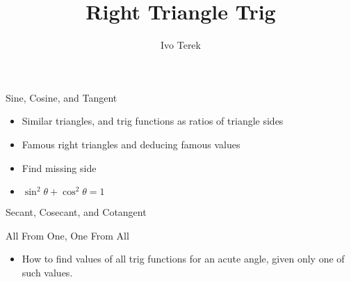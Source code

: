 \documentclass{ximera}
\author{Ivo Terek}
\title{Right Triangle Trig}
\begin{document}
\begin{abstract}
\end{abstract}
\maketitle


\begin{objectives}

\item Sine, Cosine, and Tangent
\begin{itemize}
	\item Similar triangles, and trig functions as ratios of triangle sides
        \item Famous right triangles and deducing famous values
        \item Find missing side
        \item $\sin^2\theta+\cos^2\theta=1$
\end{itemize}

\item Secant, Cosecant, and Cotangent


\item All From One, One From All
\begin{itemize}
	\item How to find values of all trig functions for an acute angle, given only one of such values.
\end{itemize}


\end{objectives}
\end{document}
